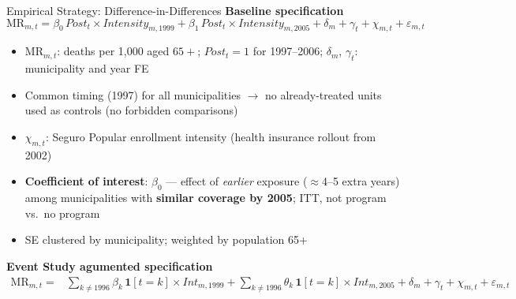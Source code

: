 \documentclass[aspectratio=169,usenames,dvipsnames]{beamer}
\begin{document}
\begin{frame}{Empirical Strategy: Difference-in-Differences}\label{empirics}
\small
\vspace{2pt}
\textbf{Baseline specification}
\begin{equation*}
\text{MR}_{m,t}
= \beta_{0}\,\textit{Post}_{t} \times \textit{Intensity}_{m,1999}
+ \beta_{1}\,\textit{Post}_{t} \times \textit{Intensity}_{m,2005}
+ \delta_{m} + \gamma_{t} + \chi_{m,t} + \varepsilon_{m,t}
\end{equation*}

\vspace{-2pt}
\begin{itemize}
  \item $\text{MR}_{m,t}$: deaths per 1,000 aged $65+$; $\textit{Post}_{t} = 1$ for 1997--2006; $\delta_m$, $\gamma_t$: municipality and year FE
  \item Common timing (1997) for all municipalities $\to$ no already-treated units used as controls (no forbidden comparisons)
  \item $\chi_{m,t}$: Seguro Popular enrollment intensity (health insurance rollout from 2002)
  \item \textbf{Coefficient of interest}: $\beta_0$ --- effect of \textit{earlier} exposure ($\approx$4--5 extra years) among municipalities with \textbf{similar coverage by 2005}; ITT, not program vs.\ no program
  \item SE clustered by municipality; weighted by population 65+
\end{itemize}
\vspace{2pt}
\textbf{Event Study agumented specification}
\vspace{-4pt}
{\footnotesize
    $\begin{aligned}
    \text{MR}_{m,t} = {} & \textstyle\sum_{k \neq 1996} \beta_{k}\,\mathbf{1}[t=k] \times \textit{Int}_{m,1999} + \textstyle\sum_{k \neq 1996} \theta_{k}\,\mathbf{1}[t=k] \times \textit{Int}_{m,2005} + \delta_{m} + \gamma_{t} + \chi_{m,t} + \varepsilon_{m,t}
    \end{aligned}$}\\[3pt]
\end{frame}

\end{document}
